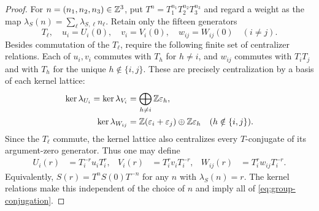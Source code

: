 \begin{proof}
For $n=(n_1,n_2,n_3)\in\mathbb Z^3$, put
$T^n=T_1^{n_1}T_2^{n_2}T_3^{n_3}$ and regard a weight as the map
$\lambda_S(n)=\sum_\ell\lambda_{S,\ell}n_\ell$.  Retain only the
fifteen generators
\[
  T_\ell,\quad u_i=U_i(0),\quad v_i=V_i(0),\quad
  w_{ij}=W_{ij}(0)\quad(i\neq j).
\]
Besides commutation of the $T_\ell$, require the following finite
set of centralizer relations.  Each of $u_i,v_i$ commutes with
$T_h$ for $h\neq i$, and $w_{ij}$ commutes with $T_iT_j$ and with
$T_h$ for the unique $h\notin\{i,j\}$.  These are precisely
centralization by a basis of each kernel lattice:
\[
\begin{aligned}
 \ker\lambda_{U_i}=\ker\lambda_{V_i}
   &=\bigoplus_{h\neq i}\mathbb Z\varepsilon_h,\\
 \ker\lambda_{W_{ij}}
   &=\mathbb Z(\varepsilon_i+\varepsilon_j)
     \oplus\mathbb Z\varepsilon_h
       \quad(h\notin\{i,j\}).
\end{aligned}
\]
Since the $T_\ell$ commute, the kernel lattice also centralizes
every $T$-conjugate of its argument-zero generator.  Thus one may define
\begin{equation}
\begin{aligned}
  U_i(r)&=T_i^{-r}u_iT_i^r,&
  V_i(r)&=T_i^rv_iT_i^{-r},&
  W_{ij}(r)&=T_i^rw_{ij}T_i^{-r}.
\end{aligned}
\label{eq:group-finite-generators}
\end{equation}
Equivalently, $S(r)=T^nS(0)T^{-n}$ for any $n$ with
$\lambda_S(n)=r$.  The kernel relations make this independent of
the choice of $n$ and imply all of \eqref{eq:group-conjugation}.


\end{proof}
